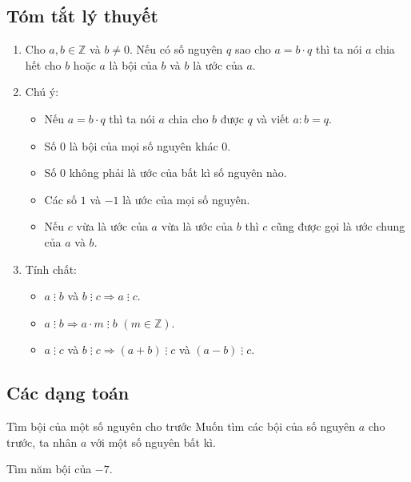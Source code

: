 \subsection{Tóm tắt lý thuyết}
\begin{enumerate}
	\item Cho $ a, b \in \mathbb{Z} $ và $ b\ne 0 $. Nếu có số nguyên $ q $ sao cho $ a=b \cdot q $ thì ta nói $ a $ chia hết cho $ b $ hoặc $ a $ là bội của $ b $ và $ b $ là ước của $ a $.
	\item Chú ý:
	\begin{itemize}
		\item Nếu $ a=b \cdot q $ thì ta nói $ a $ chia cho $ b $ được $ q $ và viết $ a:b=q $.
		\item Số $ 0 $ là bội của mọi số nguyên khác $ 0 $.
		\item Số $ 0 $ không phải là ước của bất kì số nguyên nào.
		\item Các số $ 1 $ và $ -1 $ là ước của mọi số nguyên.
		\item Nếu $ c $ vừa là ước của $ a $ vừa là ước của $ b $ thì $ c $ cũng được gọi là ước chung của $ a $ và $ b $.
	\end{itemize}
	\item Tính chất:
	\begin{itemize}
		\item $ a\;\vdots\;b $ và $ b\;\vdots\;c \Rightarrow a \;\vdots\;c $.
		\item $ a\;\vdots\;b \Rightarrow a \cdot m \;\vdots\;b $ $ (m\in \mathbb{Z}) $.
		\item $ a\;\vdots\;c $ và $ b\;\vdots\;c \Rightarrow (a+b)\;\vdots\;c $ và $ (a-b)\;\vdots\;c $.
	\end{itemize}
\end{enumerate}


\subsection{Các dạng toán}
\begin{dang}{Tìm bội của một số nguyên cho trước}
Muốn tìm các bội của số nguyên $ a $ cho trước, ta nhân $ a $ với một số nguyên bất kì.
\end{dang}
\begin{vd}%
Tìm năm bội của $ -7 $.
\end{vd}

